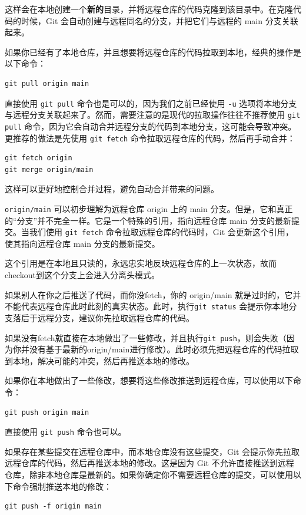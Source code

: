 \documentclass[fontset=none]{ctexart}
\begin{document}
这样会在本地创建一个\textbf{新的}目录，并将远程仓库的代码克隆到该目录中。在克隆代码的时候，Git 会自动创建与远程同名的分支，并把它们与远程的 main 分支关联起来。

如果你已经有了本地仓库，并且想要将远程仓库的代码拉取到本地，经典的操作是以下命令：
\begin{verbatim}
git pull origin main
\end{verbatim}
直接使用  \texttt{git pull}  命令也是可以的，因为我们之前已经使用  \texttt{-u}  选项将本地分支与远程分支关联起来了。然而，需要注意的是现代的拉取操作往往不推荐使用  \texttt{git pull}  命令，因为它会自动合并远程分支的代码到本地分支，这可能会导致冲突。更推荐的做法是先使用  \texttt{git fetch}  命令拉取远程仓库的代码，然后再手动合并：
\begin{verbatim}
git fetch origin
git merge origin/main
\end{verbatim}
这样可以更好地控制合并过程，避免自动合并带来的问题。

\begin{tip}
    \texttt{origin/main} 可以初步理解为远程仓库 origin 上的 main 分支。但是，它和真正的“分支”并不完全一样。它是一个特殊的引用，指向远程仓库 main 分支的最新提交。当我们使用  \texttt{git fetch}  命令拉取远程仓库的代码时，Git 会更新这个引用，使其指向远程仓库 main 分支的最新提交。

    这个引用是在本地且只读的，永远忠实地反映远程仓库的上一次状态，故而checkout到这个分支上会进入分离头模式。

    如果别人在你之后推送了代码，而你没fetch，你的 origin/main 就是过时的，它并不能代表远程仓库此时此刻的真实状态。此时，执行\texttt{git status} 会提示你本地分支落后于远程分支，建议你先拉取远程仓库的代码。

    如果没有fetch就直接在本地做出了一些修改，并且执行\texttt{git push}，则会失败（因为你并没有基于最新的origin/main进行修改）。此时必须先把远程仓库的代码拉取到本地，解决可能的冲突，然后再推送本地的修改。
\end{tip}

如果你在本地做出了一些修改，想要将这些修改推送到远程仓库，可以使用以下命令：
\begin{verbatim}
git push origin main
\end{verbatim}
直接使用  \texttt{git push}  命令也可以。

如果存在某些提交在远程仓库中，而本地仓库没有这些提交，Git 会提示你先拉取远程仓库的代码，然后再推送本地的修改。这是因为 Git 不允许直接推送到远程仓库，除非本地仓库是最新的。如果你确定你不需要远程仓库的提交，可以使用以下命令强制推送本地的修改：
\begin{verbatim}
git push -f origin main
\end{verbatim}
\end{document}
